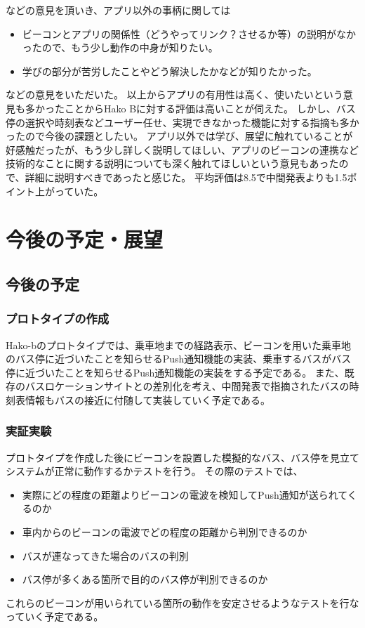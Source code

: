 \documentclass[openany,11pt,papersize]{jsbook}
\begin{document}
などの意見を頂いき、アプリ以外の事柄に関しては
\begin{itemize}

\item ビーコンとアプリの関係性（どうやってリンク？させるか等）の説明がなかったので、もう少し動作の中身が知りたい。
\item 学びの部分が苦労したことやどう解決したかなどが知りたかった。

\end{itemize}
などの意見をいただいた。
以上からアプリの有用性は高く、使いたいという意見も多かったことからHako Bに対する評価は高いことが伺えた。
しかし、バス停の選択や時刻表などユーザー任せ、実現できなかった機能に対する指摘も多かったので今後の課題としたい。
アプリ以外では学び、展望に触れていることが好感触だったが、もう少し詳しく説明してほしい、アプリのビーコンの連携など技術的なことに関する説明についても深く触れてほしいという意見もあったので、詳細に説明すべきであったと感じた。
平均評価は8.5で中間発表よりも1.5ポイント上がっていた。



\chapter{今後の予定・展望}
\section{今後の予定}
\subsection{プロトタイプの作成}
Hako-bのプロトタイプでは、乗車地までの経路表示、ビーコンを用いた乗車地のバス停に近づいたことを知らせるPush通知機能の実装、乗車するバスがバス停に近づいたことを知らせるPush通知機能の実装をする予定である。
また、既存のバスロケーションサイトとの差別化を考え、中間発表で指摘されたバスの時刻表情報もバスの接近に付随して実装していく予定である。


\subsection{実証実験}
プロトタイプを作成した後にビーコンを設置した模擬的なバス、バス停を見立てシステムが正常に動作するかテストを行う。
その際のテストでは、
\begin{itemize}

\item 実際にどの程度の距離よりビーコンの電波を検知してPush通知が送られてくるのか
\item 車内からのビーコンの電波でどの程度の距離から判別できるのか
\item バスが連なってきた場合のバスの判別
\item バス停が多くある箇所で目的のバス停が判別できるのか

\end{itemize}
これらのビーコンが用いられている箇所の動作を安定させるようなテストを行なっていく予定である。
\end{document}
